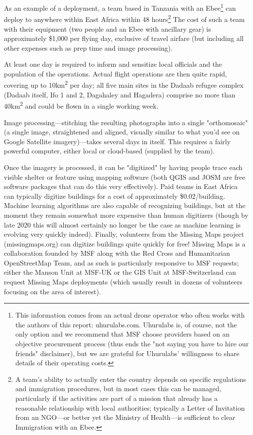 \documentclass[a4paper,12pt,twoside]{article}
\begin{document}
As an example of a deployment, a team based in Tanzania with an Ebee\footnote{This information comes from an actual drone operator who often works with the authors of this report: uhurulabs.com. Uhurulabs is, of course, not the only option and we recommend that MSF choose providers based on an objective procurement process (thus ends the "not saying you have to hire our friends" disclaimer), but we are grateful for Uhurulabs' willingness to share details of their operating costs.} can deploy to anywhere within East Africa within 48 hours\footnote{A team's ability to actually enter the country depends on specific regulations and immigration procedures, but in most cases this can be managed, particularly if the activities are part of a mission that already has a reasonable relationship with local authorities; typically a Letter of Invitation from an NGO---or better yet the Ministry of Health---is sufficient to clear Immigration with an Ebee.} The cost of such a team with their equipment (two people and an Ebee with ancillary gear) is approximately \$1,000 per flying day, exclusive of travel airfare (but including all other expenses such as prep time and image processing). 

At least one day is required to inform and sensitize local officials and the population of the operations. Actual flight operations are then quite rapid, covering up to 10km\textsuperscript{2} per day; all five main sites in the Dadaab refugee complex (Dadaab itself, Ifo 1 and 2, Dagahaley and Hagadera) comprise no more than 40km\textsuperscript{2} and could be flown in a single working week. 

Image processing---stitching the resulting photographs into a single "orthomosaic" (a single image, straightened and aligned, visually similar to what you'd see on Google Satellite imagery)---takes several days in itself. This requires a fairly powerful computer, either local or cloud-based (supplied by the team).

Once the imagery is processed, it can be "digitized" by having people trace each visible shelter or feature using mapping software (both QGIS and JOSM are free software packages that can do this very effectively). Paid teams in East Africa can typically digitize buildings for a cost of approximately \$0.02/building. Machine learning algorithms are also capable of recognizing buildings, but at the moment they remain somewhat more expensive than human digitizers (though by late 2020 this will almost certainly no longer be the case as machine learning is evolving very quickly indeed). Finally, volunteers from the Missing Maps project (missingmaps.org) can digitize buildings quite quickly for free! Missing Maps is a collaboration founded by MSF along with the Red Cross and Humanitarian OpenStreetMap Team, and as such is particularly responsive to MSF requests; either the Manson Unit at MSF-UK or the GIS Unit at MSF-Switzerland can request Missing Maps deployments (which usually result in dozens of volunteers focusing on the area of interest). 
\end{document}
